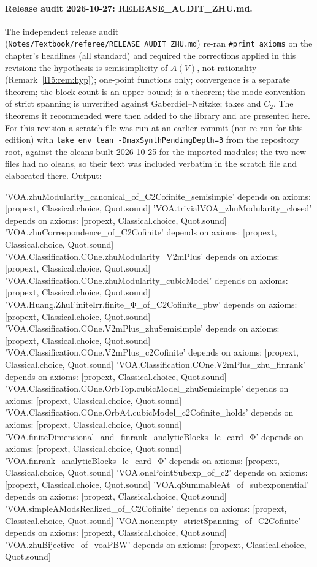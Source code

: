 \paragraph{Release audit 2026-10-27: RELEASE\_AUDIT\_ZHU.md.} The independent release audit
(\texttt{Notes/\allowbreak Textbook/\allowbreak referee/\allowbreak RELEASE\_AUDIT\_ZHU.md}) re-ran \texttt{\#print axioms} on the
chapter's headlines (all standard) and required the corrections applied in this revision: the hypothesis is semisimplicity
of $A(V)$, not rationality (Remark~\ref{l15:rem:hyp}); one-point functions only; convergence is a separate theorem; the block
count is an upper bound; \lean{[Finite (Φ W)]} is a theorem; the mode convention of strict spanning is unverified against
Gaberdiel--Neitzke; \allowbreak{} takes  and $C_2$. The theorems it
recommended were then added to the library and are presented here. For this revision a scratch file was run at
an earlier commit (not re-run for this edition) with \texttt{lake env lean -DmaxSynthPendingDepth=3} from the repository root, against the oleans built
2026-10-25 for the imported modules; the two new files had no oleans, so their text was included verbatim in the scratch
file and elaborated there. Output:
\begin{plaincode}
'VOA.zhuModularity_canonical_of_C2Cofinite_semisimple' depends on axioms: [propext, Classical.choice, Quot.sound]
'VOA.trivialVOA_zhuModularity_closed' depends on axioms: [propext, Classical.choice, Quot.sound]
'VOA.zhuCorrespondence_of_C2Cofinite' depends on axioms: [propext, Classical.choice, Quot.sound]
'VOA.Classification.COne.zhuModularity_V2mPlus' depends on axioms: [propext, Classical.choice, Quot.sound]
'VOA.Classification.COne.zhuModularity_cubicModel' depends on axioms: [propext, Classical.choice, Quot.sound]
'VOA.Huang.ZhuFiniteIrr.finite_Φ_of_C2Cofinite_pbw' depends on axioms: [propext, Classical.choice, Quot.sound]
'VOA.Classification.COne.V2mPlus_zhuSemisimple' depends on axioms: [propext, Classical.choice, Quot.sound]
'VOA.Classification.COne.V2mPlus_c2Cofinite' depends on axioms: [propext, Classical.choice, Quot.sound]
'VOA.Classification.COne.V2mPlus_zhu_finrank' depends on axioms: [propext, Classical.choice, Quot.sound]
'VOA.Classification.COne.OrbTop.cubicModel_zhuSemisimple' depends on axioms: [propext, Classical.choice, Quot.sound]
'VOA.Classification.COne.OrbA4.cubicModel_c2Cofinite_holds' depends on axioms: [propext, Classical.choice, Quot.sound]
'VOA.finiteDimensional_and_finrank_analyticBlocks_le_card_Φ' depends on axioms: [propext, Classical.choice, Quot.sound]
'VOA.finrank_analyticBlocks_le_card_Φ' depends on axioms: [propext, Classical.choice, Quot.sound]
'VOA.onePointSubexp_of_c2' depends on axioms: [propext, Classical.choice, Quot.sound]
'VOA.qSummableAt_of_subexponential' depends on axioms: [propext, Classical.choice, Quot.sound]
'VOA.simpleAModsRealized_of_C2Cofinite' depends on axioms: [propext, Classical.choice, Quot.sound]
'VOA.nonempty_strictSpanning_of_C2Cofinite' depends on axioms: [propext, Classical.choice, Quot.sound]
'VOA.zhuBijective_of_voaPBW' depends on axioms: [propext, Classical.choice, Quot.sound]
\end{plaincode}
